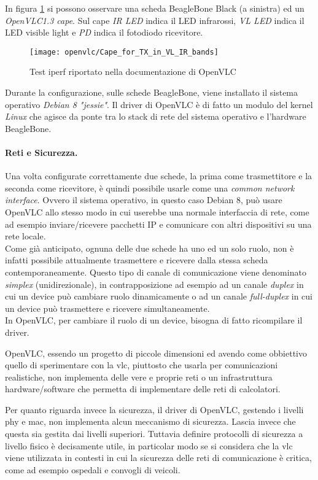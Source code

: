 In figura \ref{fig:beaglebone_cape} si possono osservare una scheda BeagleBone Black (a sinistra) ed un \textit{OpenVLC1.3 cape}. Sul cape \textit{IR LED} indica il LED infrarossi, \textit{VL LED} indica il LED visible light e \textit{PD} indica il fotodiodo ricevitore.
\begin{figure}[H] 
    \centering 
    \texttt{[image: openvlc/Cape\_for\_TX\_in\_VL\_IR\_bands]}
    \caption{Test iperf riportato nella documentazione di OpenVLC}
    \label{fig:beaglebone_cape}
\end{figure}

Durante la configurazione, sulle schede BeagleBone, viene installato il sistema operativo \textit{Debian 8 "jessie"}. Il driver di OpenVLC è di fatto un modulo del kernel \textit{Linux} che agisce da ponte tra lo stack di rete del sistema operativo e l'hardware BeagleBone.

\paragraph{Reti e Sicurezza.}
Una volta configurate correttamente due schede, la prima come trasmettitore e la seconda come ricevitore, è quindi possibile usarle come una \textit{common network interface}. Ovvero il sistema operativo, in questo caso Debian 8, può usare OpenVLC allo stesso modo in cui userebbe una normale interfaccia di rete, come ad esempio inviare/ricevere pacchetti IP e comunicare con altri dispositivi su una rete locale.\\
Come già anticipato, ognuna delle due schede ha uno ed un solo ruolo, non è infatti possibile attualmente trasmettere e ricevere dalla stessa scheda contemporaneamente. Questo tipo di canale di comunicazione viene denominato \textit{simplex} (unidirezionale), in contrapposizione ad esempio ad un canale \textit{duplex} in cui un device può cambiare ruolo dinamicamente o ad un canale \textit{full-duplex} in cui un device può trasmettere e ricevere simultaneamente.\\
In OpenVLC, per cambiare il ruolo di un device, bisogna di fatto ricompilare il driver.

OpenVLC, essendo un progetto di piccole dimensioni ed avendo come obbiettivo quello di sperimentare con la \gls{vlc}, piuttosto che usarla per comunicazioni realistiche, non implementa delle vere e proprie reti o un infrastruttura hardware/software che permetta di implementare delle reti di calcolatori.

Per quanto riguarda invece la sicurezza, il driver di OpenVLC, gestendo i livelli \gls{phy} e \gls{mac}, non implementa alcun meccanismo di sicurezza. Lascia invece che questa sia gestita dai livelli superiori. Tuttavia definire protocolli di sicurezza a livello fisico è decisamente utile, in particolar modo se si considera che la \gls{vlc} viene utilizzata in contesti in cui la sicurezza delle reti di comunicazione è critica, come ad esempio ospedali e convogli di veicoli.

